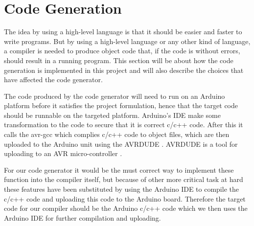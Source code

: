 \section{Code Generation}
The idea by using a high-level language is that it should be easier and faster to write programs. But by using a high-level language or any other kind of language, a compiler is needed to produce object code that, if the code is without errors, should result in a running program. This section will be about how the code generation is implemented in this project and will also describe the choices that have affected the code generator.

The code produced by the code generator will need to run on an Arduino platform before it satisfies the project formulation, hence that the target code should be runnable on the targeted platform. Arduino's IDE make some transformation to the code to secure that it is correct c/c++ code. After this it calls the avr-gcc which complies c/c++ code to object files, which are then uploaded to the Arduino unit using the AVRDUDE . AVRDUDE is a tool for uploading to an AVR micro-controller .

For our code generator it would be the must correct way to implement these function into the compiler itself, but because of other more critical task at hard these features have been substituted by using the Arduino IDE to compile the c/c++ code and uploading this code to the Arduino board. Therefore the target code for our compiler should be the Arduino c/c++ code which we then uses the Arduino IDE for further compilation and uploading.